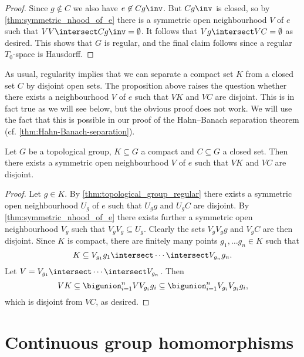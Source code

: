 \documentclass[article, a4paper, 11pt, oneside]{memoir}
\numberwithin{equation}{chapter}
\begin{document}
\begin{proof}
    Since $g \not\in C$ we also have $e \not\in Cg\inv$. But $Cg\inv$ is closed, so by \cref{thm:symmetric_nhood_of_e} there is a symmetric open neighbourhood $V$ of $e$ such that $VV \intersect Cg\inv = \emptyset$. It follows that $Vg \intersect VC = \emptyset$ as desired. This shows that $G$ is regular, and the final claim follows since a regular $T_0$-space is Hausdorff.
\end{proof}

As usual, regularity implies that we can separate a compact set $K$ from a closed set $C$ by disjoint open sets. The proposition above raises the question whether there exists a neighbourhood $V$ of $e$ such that $VK$ and $VC$ are disjoint. This is in fact true as we will see below, but the obvious proof does not work. We will use the fact that this is possible in our proof of the Hahn--Banach separation theorem (cf. \cref{thm:Hahn-Banach-separation}).

\begin{corollary}
    \label{thm:separating-compact-closed}
    Let $G$ be a topological group, $K \subseteq G$ a compact and $C \subseteq G$ a closed set. Then there exists a symmetric open neighbourhood $V$ of $e$ such that $VK$ and $VC$ are disjoint.
\end{corollary}

\begin{proof}
    Let $g \in K$. By \cref{thm:topological_group_regular} there exists a symmetric open neighbourhood $U_g$ of $e$ such that $U_g g$ and $U_g C$ are disjoint. By \cref{thm:symmetric_nhood_of_e} there exists further a symmetric open neighbourhood $V_g$ such that $V_g V_g \subseteq U_g$. Clearly the sets $V_g V_g g$ and $V_g C$ are then disjoint. Since $K$ is compact, there are finitely many points $g_1, \ldots g_n \in K$ such that
    \begin{equation*}
        K
            \subseteq V_{g_1} g_1 \intersect \cdots \intersect V_{g_n} g_n.
    \end{equation*}
    Let $V = V_{g_1} \intersect \cdots \intersect V_{g_n}$. Then
    \begin{equation*}
        VK
            \subseteq \bigunion_{i=1}^n V V_{g_i} g_i
            \subseteq \bigunion_{i=1}^n V_{g_i} V_{g_i} g_i,
    \end{equation*}
    which is disjoint from $VC$, as desired.
\end{proof}


\section{Continuous group homomorphisms}
\end{document}
